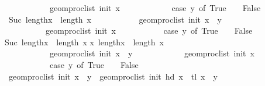 \begin{isabellebody}
\ \ \ \ \ \ \ \ \ \ \ geom{\isacharunderscore}{\kern0pt}proc{\isacharunderscore}{\kern0pt}list\ init\ x{}\ {\isacharplus}{\kern0pt}\isanewline
\ \ \ \ \ \ \ \ \ \ \ {\isacharparenleft}{\kern0pt}case\ y\ of\ True\ {\isasymRightarrow}\ {}\ {\isacharbar}{\kern0pt}\ False\ {\isasymRightarrow}\ {\isacharminus}{\kern0pt}\ {}{\isacharparenright}{\kern0pt}{\isacharparenright}{\kern0pt}{\isachardoublequoteclose}\isanewline
\ \ \isamarkupfalse%
\ \isamarkupfalse%
\ {\isachardoublequoteopen}Suc\ lengthx\ {\isacharequal}{\kern0pt}\ length\ x\ {\isasymLongrightarrow}\isanewline
\ \ \ \ \ \ \ \ \ \ geom{\isacharunderscore}{\kern0pt}proc{\isacharunderscore}{\kern0pt}list\ init\ {\isacharparenleft}{\kern0pt}x\ {\isacharat}{\kern0pt}\ {\isacharbrackleft}{\kern0pt}y{\isacharbrackright}{\kern0pt}{\isacharparenright}{\kern0pt}\ {\isacharequal}{\kern0pt}\isanewline
\ \ \ \ \ \ \ \ \ \ geom{\isacharunderscore}{\kern0pt}proc{\isacharunderscore}{\kern0pt}list\ init\ x\ {\isacharplus}{\kern0pt}\isanewline
\ \ \ \ \ \ \ \ \ \ {\isacharparenleft}{\kern0pt}case\ y\ of\ True\ {\isasymRightarrow}\ {}\ {\isacharbar}{\kern0pt}\ False\ {\isasymRightarrow}\ {\isacharminus}{\kern0pt}\ {}{\isacharparenright}{\kern0pt}{\isachardoublequoteclose}\isanewline
\ \ \isamarkupfalse%
{\isacharminus}{\kern0pt}\isanewline
\ \ \ \ \isamarkupfalse%
{\isachardoublequoteopen}Suc\ lengthx\ {\isacharequal}{\kern0pt}\ length\ x{\isachardoublequoteclose}\isanewline
{\isachardoublequoteopen}{\isasymAnd}x{}{\isachardot}{\kern0pt}\ lengthx\ {\isacharequal}{\kern0pt}\ length\ x{}\ {\isasymLongrightarrow}\isanewline
\ \ \ \ \ \ \ \ \ \ \ geom{\isacharunderscore}{\kern0pt}proc{\isacharunderscore}{\kern0pt}list\ init\ {\isacharparenleft}{\kern0pt}x{}\ {\isacharat}{\kern0pt}\ {\isacharbrackleft}{\kern0pt}y{\isacharbrackright}{\kern0pt}{\isacharparenright}{\kern0pt}\ {\isacharequal}{\kern0pt}\isanewline
\ \ \ \ \ \ \ \ \ \ \ geom{\isacharunderscore}{\kern0pt}proc{\isacharunderscore}{\kern0pt}list\ init\ x{}\ {\isacharplus}{\kern0pt}\isanewline
\ \ \ \ \ \ \ \ \ \ \ {\isacharparenleft}{\kern0pt}case\ y\ of\ True\ {\isasymRightarrow}\ {}\ {\isacharbar}{\kern0pt}\ False\ {\isasymRightarrow}\ {\isacharminus}{\kern0pt}\ {}{\isacharparenright}{\kern0pt}{\isachardoublequoteclose}\isanewline
\ \ \ \ \isamarkupfalse%
\ {\isachardoublequoteopen}geom{\isacharunderscore}{\kern0pt}proc{\isacharunderscore}{\kern0pt}list\ init\ {\isacharparenleft}{\kern0pt}x\ {\isacharat}{\kern0pt}\ {\isacharbrackleft}{\kern0pt}y{\isacharbrackright}{\kern0pt}{\isacharparenright}{\kern0pt}\ {\isacharequal}{\kern0pt}\ geom{\isacharunderscore}{\kern0pt}proc{\isacharunderscore}{\kern0pt}list\ init\ {\isacharparenleft}{\kern0pt}hd\ x\ {\isacharhash}{\kern0pt}\ {\isacharparenleft}{\kern0pt}tl\ x\ {\isacharat}{\kern0pt}\ {\isacharbrackleft}{\kern0pt}y{\isacharbrackright}{\kern0pt}{\isacharparenright}{\kern0pt}{\isacharparenright}{\kern0pt}{\isachardoublequoteclose}\isanewline

\end{isabellebody}
